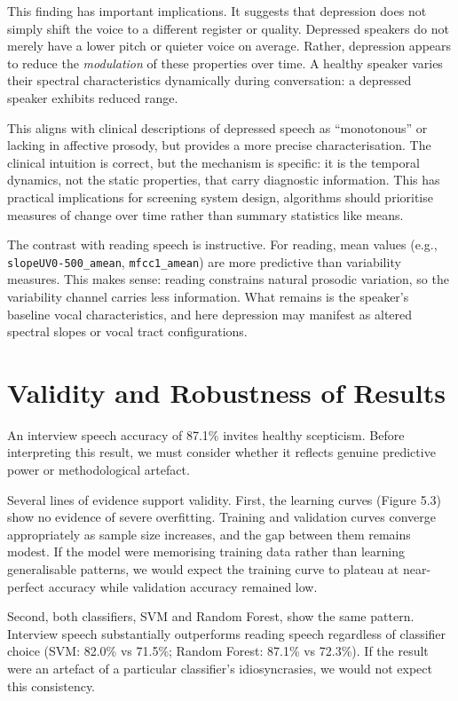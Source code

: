 This finding has important implications. It suggests that depression does not simply shift the voice to a different register or quality. Depressed speakers do not merely have a lower pitch or quieter voice on average. Rather, depression appears to reduce the \textit{modulation} of these properties over time. A healthy speaker varies their spectral characteristics dynamically during conversation: a depressed speaker exhibits reduced range.

This aligns with clinical descriptions of depressed speech as ``monotonous'' or lacking in affective prosody, but provides a more precise characterisation. The clinical intuition is correct, but the mechanism is specific: it is the temporal dynamics, not the static properties, that carry diagnostic information. This has practical implications for screening system design, algorithms should prioritise measures of change over time rather than summary statistics like means.

The contrast with reading speech is instructive. For reading, mean values (e.g., \texttt{slopeUV0\allowbreak{}-500\_amean}, \texttt{mfcc1\_amean}) are more predictive than variability measures. This makes sense: reading constrains natural prosodic variation, so the variability channel carries less information. What remains is the speaker's baseline vocal characteristics, and here depression may manifest as altered spectral slopes or vocal tract configurations.

\section{Validity and Robustness of Results}

An interview speech accuracy of 87.1\% invites healthy scepticism. Before interpreting this result, we must consider whether it reflects genuine predictive power or methodological artefact.

Several lines of evidence support validity. First, the learning curves (Figure 5.3) show no evidence of severe overfitting. Training and validation curves converge appropriately as sample size increases, and the gap between them remains modest. If the model were memorising training data rather than learning generalisable patterns, we would expect the training curve to plateau at near-perfect accuracy while validation accuracy remained low.

Second, both classifiers, SVM and Random Forest, show the same pattern. Interview speech substantially outperforms reading speech regardless of classifier choice (SVM: 82.0\% vs 71.5\%; Random Forest: 87.1\% vs 72.3\%). If the result were an artefact of a particular classifier's idiosyncrasies, we would not expect this consistency.

